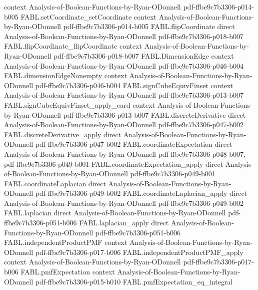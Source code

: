 \begin{theorem}
  {context}
  {Analysis-of-Boolean-Functions-by-Ryan-ODonnell}
  {pdf-ffbe9c7b3306-p014-b005}
\proofstep
  {FABL.setCoordinate_setCoordinate}
  {context}
  {Analysis-of-Boolean-Functions-by-Ryan-ODonnell}
  {pdf-ffbe9c7b3306-p014-b005}
\proofstep
  {FABL.flipCoordinate}
  {direct}
  {Analysis-of-Boolean-Functions-by-Ryan-ODonnell}
  {pdf-ffbe9c7b3306-p018-b007}
\proofstep
  {FABL.flipCoordinate_flipCoordinate}
  {context}
  {Analysis-of-Boolean-Functions-by-Ryan-ODonnell}
  {pdf-ffbe9c7b3306-p018-b007}
\proofstep
  {FABL.DimensionEdge}
  {context}
  {Analysis-of-Boolean-Functions-by-Ryan-ODonnell}
  {pdf-ffbe9c7b3306-p046-b004}
\proofstep
  {FABL.dimensionEdgeNonempty}
  {context}
  {Analysis-of-Boolean-Functions-by-Ryan-ODonnell}
  {pdf-ffbe9c7b3306-p046-b004}
\proofstep
  {FABL.signCubeEquivFinset}
  {context}
  {Analysis-of-Boolean-Functions-by-Ryan-ODonnell}
  {pdf-ffbe9c7b3306-p013-b007}
\proofstep
  {FABL.signCubeEquivFinset_apply_card}
  {context}
  {Analysis-of-Boolean-Functions-by-Ryan-ODonnell}
  {pdf-ffbe9c7b3306-p013-b007}
\proofstep
  {FABL.discreteDerivative}
  {direct}
  {Analysis-of-Boolean-Functions-by-Ryan-ODonnell}
  {pdf-ffbe9c7b3306-p047-b002}
\proofstep
  {FABL.discreteDerivative_apply}
  {direct}
  {Analysis-of-Boolean-Functions-by-Ryan-ODonnell}
  {pdf-ffbe9c7b3306-p047-b002}
\proofstep
  {FABL.coordinateExpectation}
  {direct}
  {Analysis-of-Boolean-Functions-by-Ryan-ODonnell}
  {pdf-ffbe9c7b3306-p048-b007,
    pdf-ffbe9c7b3306-p049-b001}
\proofstep
  {FABL.coordinateExpectation_apply}
  {direct}
  {Analysis-of-Boolean-Functions-by-Ryan-ODonnell}
  {pdf-ffbe9c7b3306-p049-b001}
\proofstep
  {FABL.coordinateLaplacian}
  {direct}
  {Analysis-of-Boolean-Functions-by-Ryan-ODonnell}
  {pdf-ffbe9c7b3306-p049-b002}
\proofstep
  {FABL.coordinateLaplacian_apply}
  {direct}
  {Analysis-of-Boolean-Functions-by-Ryan-ODonnell}
  {pdf-ffbe9c7b3306-p049-b002}
\proofstep
  {FABL.laplacian}
  {direct}
  {Analysis-of-Boolean-Functions-by-Ryan-ODonnell}
  {pdf-ffbe9c7b3306-p051-b006}
\proofstep
  {FABL.laplacian_apply}
  {direct}
  {Analysis-of-Boolean-Functions-by-Ryan-ODonnell}
  {pdf-ffbe9c7b3306-p051-b006}
\proofstep
  {FABL.independentProductPMF}
  {context}
  {Analysis-of-Boolean-Functions-by-Ryan-ODonnell}
  {pdf-ffbe9c7b3306-p017-b006}
\proofstep
  {FABL.independentProductPMF_apply}
  {context}
  {Analysis-of-Boolean-Functions-by-Ryan-ODonnell}
  {pdf-ffbe9c7b3306-p017-b006}
\proofstep
  {FABL.pmfExpectation}
  {context}
  {Analysis-of-Boolean-Functions-by-Ryan-ODonnell}
  {pdf-ffbe9c7b3306-p015-b010}
\proofstep
  {FABL.pmfExpectation_eq_integral}

\end{theorem}
